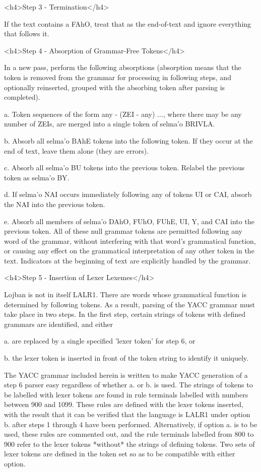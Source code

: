 <h4>Step 3 - Termination</h4>

If the text contains a FAhO, treat that as the end-of-text
    and ignore everything that follows it.

<h4>Step 4 - Absorption of Grammar-Free Tokens</h4>

In a new pass, perform the following absorptions (absorption
    means that the token is removed from the grammar for processing
    in following steps, and optionally reinserted, grouped with the
    absorbing token after parsing is completed).

a. Token sequences of the form any - (ZEI - any) ..., where
    there may be any number of ZEIs, are merged into a single token
    of selma'o BRIVLA.

b. Absorb all selma'o BAhE tokens into the following token.
    If they occur at the end of text, leave them alone (they are
    errors).

c. Absorb all selma'o BU tokens into the previous token.
    Relabel the previous token as selma'o BY.

d. If selma'o NAI occurs immediately following any of tokens
    UI or CAI, absorb the NAI into the previous token.

e. Absorb all members of selma'o DAhO, FUhO, FUhE, UI, Y,
    and CAI into the previous token. All of these null grammar
    tokens are permitted following any word of the grammar, without
    interfering with that word's grammatical function, or causing
    any effect on the grammatical interpretation of any other token
    in the text. Indicators at the beginning of text are explicitly
    handled by the grammar.

<h4>Step 5 - Insertion of Lexer Lexemes</h4>

Lojban is not in itself LALR1. There are words whose
    grammatical function is determined by following tokens. As a
    result, parsing of the YACC grammar must take place in two
    steps. In the first step, certain strings of tokens with
    defined grammars are identified, and either

a. are replaced by a single specified 'lexer token' for step
    6, or

b. the lexer token is inserted in front of the token string
    to identify it uniquely.

The YACC grammar included herein is written to make YACC
    generation of a step 6 parser easy regardless of whether a. or
    b. is used. The strings of tokens to be labelled with lexer
    tokens are found in rule terminals labelled with numbers
    between 900 and 1099. These rules are defined with the lexer
    tokens inserted, with the result that it can be verified that
    the language is LALR1 under option b. after steps 1 through 4
    have been performed. Alternatively, if option a. is to be used,
    these rules are commented out, and the rule terminals labelled
    from 800 to 900 refer to the lexer tokens *without* the strings
    of defining tokens. Two sets of lexer tokens are defined in the
    token set so as to be compatible with either option.

